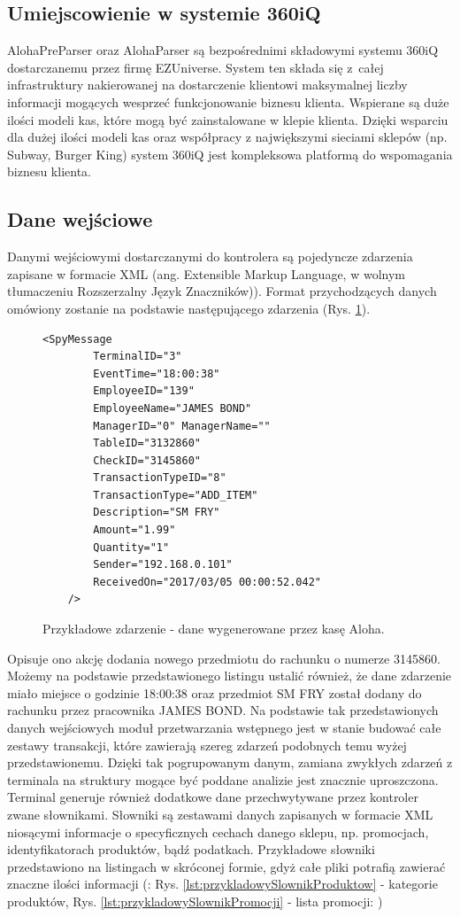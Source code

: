 \documentclass[a4paper]{book}
\begin{document}
\subsection{Umiejscowienie w systemie 360iQ}
AlohaPreParser oraz AlohaParser są bezpośrednimi składowymi systemu 360iQ dostarczanemu przez firmę EZUniverse. System ten składa się z~całej infrastruktury nakierowanej na dostarczenie klientowi maksymalnej liczby informacji mogących wesprzeć funkcjonowanie biznesu klienta. Wspierane są duże ilości modeli kas, które mogą być zainstalowane w klepie klienta. Dzięki wsparciu dla dużej ilości modeli kas oraz współpracy z największymi sieciami sklepów (np. Subway, Burger King) system 360iQ jest kompleksowa platformą do wspomagania biznesu klienta.
\subsection{Dane wejściowe}
Danymi wejściowymi dostarczanymi do kontrolera są pojedyncze zdarzenia zapisane w formacie XML (ang. Extensible Markup Language, w wolnym tłumaczeniu Rozszerzalny Język Znaczników)).
Format przychodzących danych omówiony zostanie na podstawie następującego zdarzenia (Rys. \ref{lst:przykladoweZdarzenieAloha}).  
\begin{figure}[t]
	\begin{lstlisting}[frame=single, breaklines=true, numbers=none]
	<SpyMessage 
		TerminalID="3"
		EventTime="18:00:38" 
		EmployeeID="139" 
		EmployeeName="JAMES BOND" 
		ManagerID="0" ManagerName="" 
		TableID="3132860" 
		CheckID="3145860" 
		TransactionTypeID="8" 
		TransactionType="ADD_ITEM" 
		Description="SM FRY" 
		Amount="1.99" 
		Quantity="1" 
		Sender="192.168.0.101" 
		ReceivedOn="2017/03/05 00:00:52.042" 
	/>
	\end{lstlisting}
	\caption{Przykładowe zdarzenie - dane wygenerowane przez kasę Aloha.}
	\label{lst:przykladoweZdarzenieAloha}
\end{figure}
Opisuje ono akcję dodania nowego przedmiotu do rachunku o numerze 3145860. Możemy na podstawie przedstawionego listingu ustalić również, że dane zdarzenie miało miejsce o godzinie 18:00:38 oraz przedmiot SM FRY został dodany do rachunku przez pracownika JAMES BOND. Na podstawie tak przedstawionych danych wejściowych moduł przetwarzania wstępnego jest w stanie budować całe zestawy transakcji, które zawierają szereg zdarzeń podobnych temu wyżej przedstawionemu. Dzięki tak pogrupowanym danym, zamiana zwykłych zdarzeń z terminala na struktury mogące być poddane analizie jest znacznie uproszczona. Terminal generuje również dodatkowe dane przechwytywane przez kontroler zwane słownikami. Słowniki są zestawami danych zapisanych w formacie XML niosącymi informacje o specyficznych cechach danego sklepu, np. promocjach, identyfikatorach produktów, bądź podatkach. Przykładowe słowniki przedstawiono na listingach w skróconej formie, gdyż całe pliki potrafią zawierać znaczne ilości informacji (: Rys. \ref{lst:przykladowySlownikProduktow} - kategorie produktów, Rys. \ref{lst:przykladowySlownikPromocji} - lista promocji: )
\end{document}
